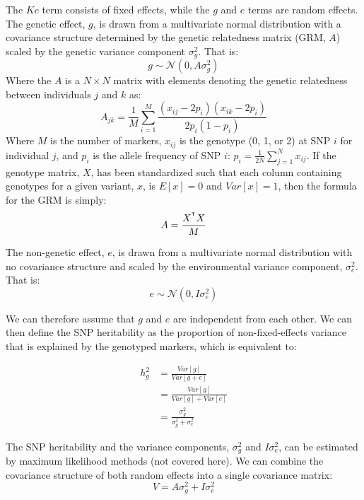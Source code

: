 \documentclass[12pt]{article}
\begin{document}
The $Kc$ term consists of fixed effects, while the $g$ and $e$ terms are random effects.
The genetic effect, $g$, is drawn from a multivariate normal distribution with a covariance structure determined by the genetic relatedness matrix (GRM, $A$) scaled by the genetic variance component $\sigma_g^2$. That is:
$$ g \sim \mathcal{N} (0, A \sigma_g^2)$$
Where the $A$ is a $N \times N$ matrix with elements denoting the genetic relatedness between individuals $j$ and $k$ as:
$$ A_{jk} = \frac{1}{M} \sum_{i=1}^{M}
\frac{(x_{ij} - 2 p_i)(x_{ik} - 2 p_i)}
{2 p_i (1 - p_i)}
$$
Where $M$ is the number of markers, $x_{ij}$ is the genotype (0, 1, or 2) at SNP $i$ for individual $j$, and $p_i$ is the allele frequency of SNP $i$: $p_i = \frac{1}{2 N} \sum_{j=1}^{N} x_{ij}$.
If the genotype matrix, $X$, has been standardized such that each column containing genotypes for a given variant, $x$, is $E[x] = 0$ and $Var[x] = 1$, then the formula for the GRM is simply:
$$ A = \frac{ X^{^\intercal} X }{M} $$

The non-genetic effect, $e$, is drawn from a multivariate normal distribution with no covariance structure and scaled by the environmental variance component, $\sigma_e^2$. That is:
$$ e \sim \mathcal{N} (0, I \sigma_e^2) $$

We can therefore assume that $g$ and $e$ are independent from each other.
We can then define the SNP heritability as the proportion of non-fixed-effects variance that is explained by the genotyped markers, which is equivalent to:

\begin{align*}
    h_g^2 &= \frac{Var[g]}{Var[g + e]} \\
    &= \frac{Var[g]}{Var[g] + Var[e]} \\
    &= \frac{\sigma_g^2}{\sigma_g^2 + \sigma_e^2}
\end{align*}

The SNP heritability and the variance components, $\sigma_g^2$ and $I \sigma_e^2$, can be estimated by maximum likelihood methods (not covered here).
We can combine the covariance structure of both random effects into a single covariance matrix:
$$ V = A \sigma_g^2 + I \sigma_e^2 $$
\end{document}
